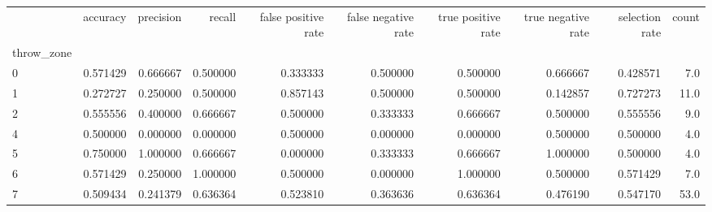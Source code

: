 \begin{tabular}{lrrrrrrrrr}
\toprule
{} &  accuracy &  precision &    recall &  false positive rate &  false negative rate &  true positive rate &  true negative rate &  selection rate &  count \\
throw\_zone &           &            &           &                      &                      &                     &                     &                 &        \\
\midrule
0          &  0.571429 &   0.666667 &  0.500000 &             0.333333 &             0.500000 &            0.500000 &            0.666667 &        0.428571 &    7.0 \\
1          &  0.272727 &   0.250000 &  0.500000 &             0.857143 &             0.500000 &            0.500000 &            0.142857 &        0.727273 &   11.0 \\
2          &  0.555556 &   0.400000 &  0.666667 &             0.500000 &             0.333333 &            0.666667 &            0.500000 &        0.555556 &    9.0 \\
4          &  0.500000 &   0.000000 &  0.000000 &             0.500000 &             0.000000 &            0.000000 &            0.500000 &        0.500000 &    4.0 \\
5          &  0.750000 &   1.000000 &  0.666667 &             0.000000 &             0.333333 &            0.666667 &            1.000000 &        0.500000 &    4.0 \\
6          &  0.571429 &   0.250000 &  1.000000 &             0.500000 &             0.000000 &            1.000000 &            0.500000 &        0.571429 &    7.0 \\
7          &  0.509434 &   0.241379 &  0.636364 &             0.523810 &             0.363636 &            0.636364 &            0.476190 &        0.547170 &   53.0 \\
\bottomrule
\end{tabular}
